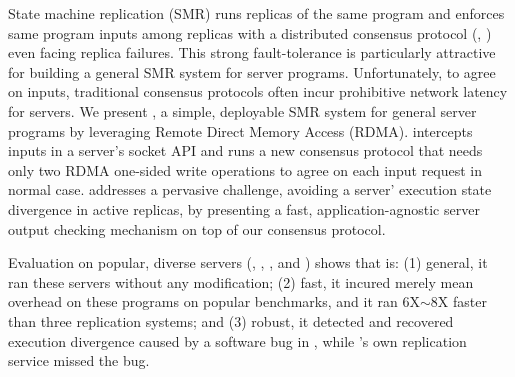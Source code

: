 

State machine replication (SMR) runs replicas of the same program and 
enforces same program inputs among replicas with a distributed consensus 
protocol (\eg, \paxos) even facing replica failures. This strong 
fault-tolerance is particularly attractive for building a general SMR system 
for server programs. Unfortunately, to agree on inputs, traditional consensus 
protocols often incur prohibitive network latency for servers. We present \xxx, 
a simple, deployable SMR system for general server programs by leveraging 
Remote Direct Memory Access (RDMA). \xxx intercepts inputs in a server's socket 
API and runs a new \paxos consensus protocol that needs only two RDMA one-sided 
write operations to agree on each input request in normal case. \xxx addresses 
a pervasive challenge, avoiding a server' execution state divergence in active 
replicas, by presenting a fast, application-agnostic server output checking 
mechanism on top of our consensus protocol.

Evaluation on \nprog popular, diverse servers (\eg, \memcached, \mysql, 
and \clamav) shows that \xxx is: (1) general, it ran these servers without any 
modification; (2) fast, it incured merely \overhead mean overhead 
on these programs on popular benchmarks, and it ran 6X$\sim$8X faster than 
three replication systems; and (3) robust, it detected and recovered execution 
divergence caused by a software bug in \redis, while \redis's own replication 
service missed the bug.


